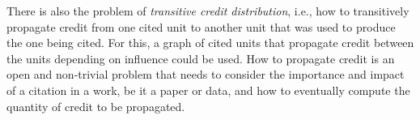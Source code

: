\documentclass[preprint,12pt,sort&compress]{elsarticle}
\newcommand{\rtwo}[1]{\textcolor{reviewer2}{#1}}
\begin{document}
\rtwo{There is also the problem of \emph{transitive credit distribution}, i.e., how to transitively propagate credit from one cited unit to another unit that was used to produce the one being cited. For this, 
a graph of cited units that propagate credit between the units depending on  influence could be used. How to propagate credit is an open and non-trivial problem that needs to consider the importance and impact of a citation in a work, be it a paper or data, and how to eventually compute the quantity of credit to be propagated.}


\end{document}
